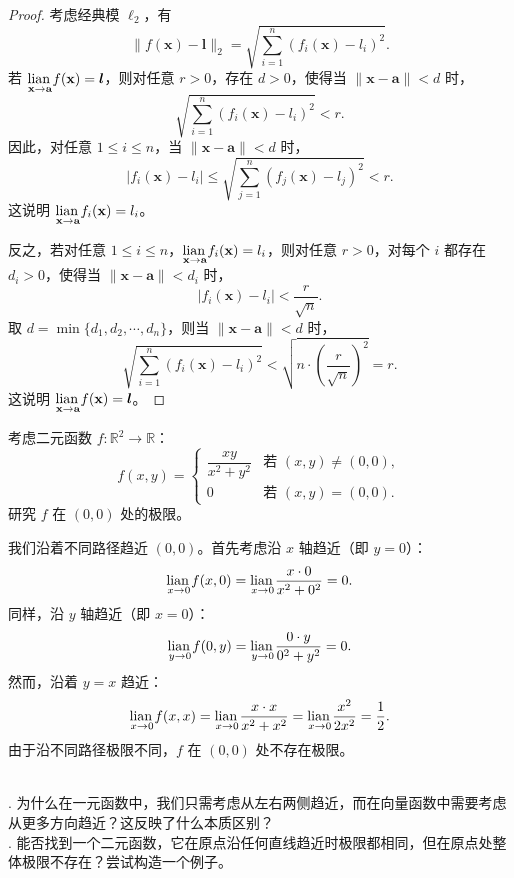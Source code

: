 \documentclass[12pt,UTF8]{ctexbook}
\begin{document}
\begin{proof}
考虑经典模 $\ell_2$，有
$$ \|f(\mathbf{x}) - \boldsymbol{l}\|_2 = \sqrt{\sum_{i=1}^n (f_i(\mathbf{x}) - l_i)^2}. $$
若 $\underset{\mathbf{x}\to \mathbf{a}}{\operatorname{lian}\,} f(\mathbf{x}) = \boldsymbol{l}$，则对任意 $r>0$，存在 $d>0$，使得当 $\|\mathbf{x}-\mathbf{a}\|<d$ 时，
$$ \sqrt{\sum_{i=1}^n (f_i(\mathbf{x}) - l_i)^2} < r. $$
因此，对任意 $1 \leqslant i \leqslant n$，当 $\|\mathbf{x}-\mathbf{a}\|<d$ 时，
$$ |f_i(\mathbf{x}) - l_i| \leqslant \sqrt{\sum_{j=1}^n (f_j(\mathbf{x}) - l_j)^2} < r. $$
这说明 $\underset{\mathbf{x}\to \mathbf{a}}{\operatorname{lian}\,} f_i(\mathbf{x}) = l_i$。

反之，若对任意 $1 \leqslant i \leqslant n$，$\underset{\mathbf{x}\to \mathbf{a}}{\operatorname{lian}\,} f_i(\mathbf{x}) = l_i$，则对任意 $r>0$，对每个 $i$ 都存在 $d_i>0$，使得当 $\|\mathbf{x}-\mathbf{a}\|<d_i$ 时，
$$ |f_i(\mathbf{x}) - l_i| < \frac{r}{\sqrt{n}}. $$
取 $d = \min\{d_1, d_2, \cdots, d_n\}$，则当 $\|\mathbf{x}-\mathbf{a}\|<d$ 时，
$$ \sqrt{\sum_{i=1}^n (f_i(\mathbf{x}) - l_i)^2} < \sqrt{n \cdot \left(\frac{r}{\sqrt{n}}\right)^2} = r. $$
这说明 $\underset{\mathbf{x}\to \mathbf{a}}{\operatorname{lian}\,} f(\mathbf{x}) = \boldsymbol{l}$。
\end{proof}

\begin{ex}
考虑二元函数 $f: \mathbb{R}^2 \to \mathbb{R}$：
$$ f(x, y) = \begin{cases}
\dfrac{xy}{x^2+y^2} & \text{若 } (x, y) \neq (0, 0), \\
0 & \text{若 } (x, y) = (0, 0).
\end{cases} $$
研究 $f$ 在 $(0, 0)$ 处的极限。

我们沿着不同路径趋近 $(0, 0)$。首先考虑沿 $x$ 轴趋近（即 $y=0$）：
$$ \underset{x\to 0}{\operatorname{lian}\,} f(x, 0) = \underset{x\to 0}{\operatorname{lian}\,} \frac{x\cdot 0}{x^2+0^2} = 0. $$
同样，沿 $y$ 轴趋近（即 $x=0$）：
$$ \underset{y\to 0}{\operatorname{lian}\,} f(0, y) = \underset{y\to 0}{\operatorname{lian}\,} \frac{0\cdot y}{0^2+y^2} = 0. $$
然而，沿着 $y=x$ 趋近：
$$ \underset{x\to 0}{\operatorname{lian}\,} f(x, x) = \underset{x\to 0}{\operatorname{lian}\,} \frac{x\cdot x}{x^2+x^2} = \underset{x\to 0}{\operatorname{lian}\,} \frac{x^2}{2x^2} = \frac{1}{2}. $$
由于沿不同路径极限不同，$f$ 在 $(0, 0)$ 处不存在极限。
\end{ex}

\begin{sk}
\mbox{} \\
. 为什么在一元函数中，我们只需考虑从左右两侧趋近，而在向量函数中需要考虑从更多方向趋近？这反映了什么本质区别？\\
. 能否找到一个二元函数，它在原点沿任何直线趋近时极限都相同，但在原点处整体极限不存在？尝试构造一个例子。
\end{sk}
\end{document}
